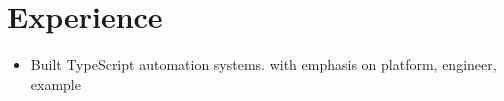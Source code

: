 \documentclass{article}
\begin{document}
\section{Experience}
\begin{itemize}
\item Built TypeScript automation systems. with emphasis on platform, engineer, example
\end{itemize}
\end{document}
